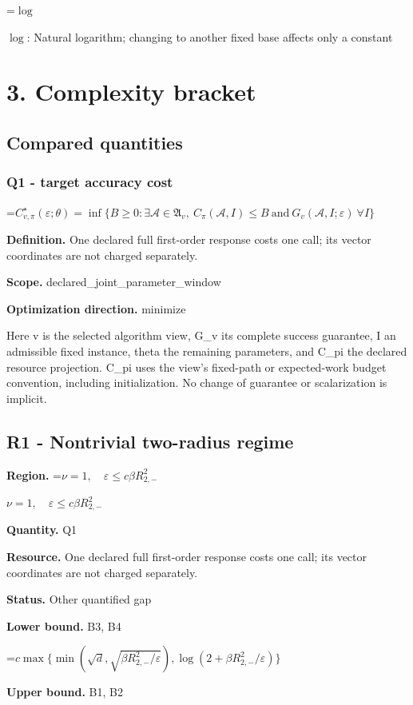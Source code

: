 \documentclass[10pt,a4paper]{article}
\newcommand{\AtlasMath}[1]{\par\begingroup\centering\setbox0=\hbox{$\displaystyle #1$}\ifdim\wd0>1.4\linewidth\typeout{ATLAS WIDE FORMULA: \the\wd0}\fi\ifdim\wd0>\linewidth\resizebox{\linewidth}{!}{\box0}\else\box0\fi\par\endgroup}
\newcommand{\AtlasInlineMath}[1]{\begingroup\setbox0=\hbox{$#1$}\ifdim\wd0>.4\linewidth\endgroup\AtlasMath{#1}\else\endgroup$#1$\fi}
\begin{document}
\AtlasInlineMath{\log}: Natural logarithm; changing to another fixed base affects only a constant

\section{3. Complexity bracket}
\subsection{Compared quantities}
\subsubsection{Q1 - target accuracy cost}
\AtlasMath{C^\star_{v,\pi}(\varepsilon;\theta)=\inf\{B\ge0:\exists\mathcal A\in\mathfrak A_v,\ C_\pi(\mathcal A,I)\le B\ \text{and}\ G_v(\mathcal A,I;\varepsilon)\ \forall I\}}
\textbf{Definition.} One declared full first-order response costs one call; its vector coordinates are not charged separately.

\textbf{Scope.} declared\_joint\_parameter\_window

\textbf{Optimization direction.} minimize

Here v is the selected algorithm view, G\_v its complete success guarantee, I an admissible fixed instance, theta the remaining parameters, and C\_pi the declared resource projection. C\_pi uses the view's fixed-path or expected-work budget convention, including initialization. No change of guarantee or scalarization is implicit.

\subsection{R1 - Nontrivial two-radius regime}
\textbf{Region.} \AtlasInlineMath{\nu=1,\quad\varepsilon\le c\beta R_{2,-}^2}

\textbf{Quantity.} Q1

\textbf{Resource.} One declared full first-order response costs one call; its vector coordinates are not charged separately.

\textbf{Status.} Other quantified gap

\textbf{Lower bound.} B3, B4

\AtlasMath{c\max\{\min(\sqrt d,\sqrt{\beta R_{2,-}^2/\varepsilon}),\log(2+\beta R_{2,-}^2/\varepsilon)\}}
\textbf{Upper bound.} B1, B2
\end{document}
